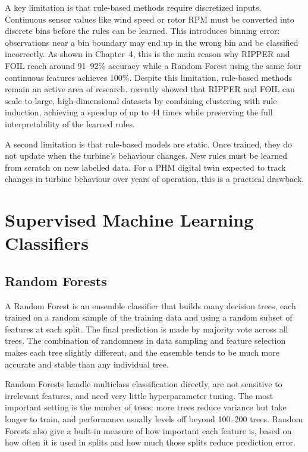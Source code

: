 A key limitation is that rule-based methods require discretized inputs. Continuous sensor
values like wind speed or rotor RPM must be converted into discrete bins before the rules
can be learned. This introduces binning error: observations near a bin boundary may
end up in the wrong bin and be classified incorrectly. As shown in Chapter~4, this is the
main reason why RIPPER and FOIL reach around 91--92\% accuracy while a Random Forest
using the same four continuous features achieves 100\%. Despite this limitation,
rule-based methods remain an active area of research. \citet{nossig2024} recently showed that RIPPER and FOIL can scale to large,
high-dimensional datasets by combining clustering with rule induction, achieving a
speedup of up to 44 times while preserving the full interpretability of the learned rules.

A second limitation is that rule-based models are static. Once trained, they do not
update when the turbine's behaviour changes. New rules must be learned from scratch on
new labelled data. For a PHM digital twin expected to track changes in turbine behaviour
over years of operation, this is a practical drawback.

\section{Supervised Machine Learning Classifiers}
\label{sec:bg:supervised}

\subsection{Random Forests}
\label{subsec:bg:rf}

A Random Forest \citep{breiman2001} is an ensemble classifier that builds many decision
trees, each trained on a random sample of the training data and using a random subset of
features at each split. The final prediction is made by majority vote across all trees.
The combination of randomness in data sampling and feature selection makes each tree
slightly different, and the ensemble tends to be much more accurate and stable than any
individual tree.

Random Forests handle multiclass classification directly, are not sensitive to irrelevant
features, and need very little hyperparameter tuning. The most important setting is the
number of trees: more trees reduce variance but take longer to train, and performance
usually levels off beyond 100--200 trees. Random Forests also give a built-in measure of
how important each feature is, based on how often it is used in splits and how much those
splits reduce prediction error.

